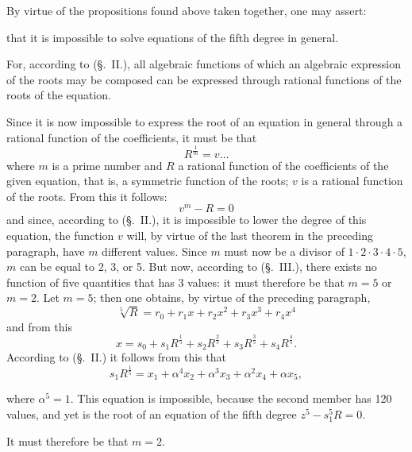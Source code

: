 \documentclass{article}
\begin{document}
By virtue of the propositions found above taken together, one may assert:

that it is impossible to solve equations of the fifth degree in general.

For, according to (§.~II.), all algebraic functions of which an algebraic expression of the roots may be composed can be expressed through rational functions of the roots of the equation.

Since it is now impossible to express the root of an equation in general through a rational function of the coefficients, it must be that
\[ R^{\frac{1}{m}} = v \ldots \]
where $m$ is a prime number and $R$ a rational function of the coefficients of the given equation, that is, a symmetric function of the roots; $v$ is a rational function of the roots. From this it follows:
\[ v^{m} - R = 0 \]
and since, according to (§.~II.), it is impossible to lower the degree of this equation, the function $v$ will, by virtue of the last theorem in the preceding paragraph, have $m$ different values. Since $m$ must now be a divisor of $1 \cdot 2 \cdot 3 \cdot 4 \cdot 5$, $m$ can be equal to 2, 3, or 5. But now, according to (§.~III.), there exists no function of five quantities that has 3 values: it must therefore be that $m = 5$ or $m = 2$. Let $m = 5$; then one obtains, by virtue of the preceding paragraph,
\[ \sqrt[5]{R} = r_0 + r_1 x + r_2 x^{2} + r_3 x^{3} + r_4 x^{4} \]
and from this
\[ x = s_0 + s_1 R^{\frac{1}{5}} + s_2 R^{\frac{2}{5}} + s_3 R^{\frac{3}{5}} + s_4 R^{\frac{4}{5}}. \]
According to (§.~II.) it follows from this that
\[ s_1 R^{\frac{1}{5}} = x_1 + \alpha^{4} x_2 + \alpha^{3} x_3 + \alpha^{2} x_4 + \alpha x_5, \]

where $\alpha^{5} = 1$. This equation is impossible, because the second member has 120 values, and yet is the root of an equation of the fifth degree $z^{5} - s_1^{5} R = 0$.

It must therefore be that $m = 2$.
\end{document}

